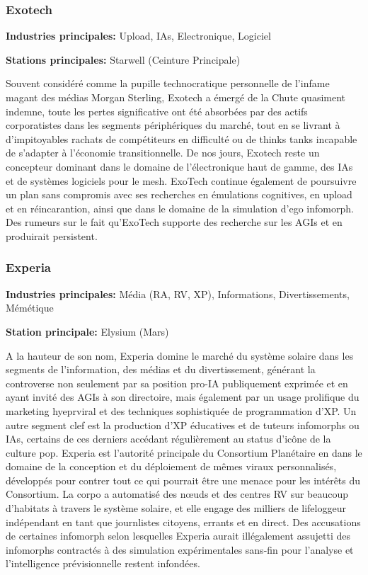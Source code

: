 \subsubsection{Exotech} \label{sec:exotech} 

\textbf{Industries principales:} Upload, IAs, Electronique, Logiciel 

\textbf{Stations principales:} Starwell (Ceinture Principale) 

Souvent considéré comme la pupille technocratique personnelle de l'infame magant des médias Morgan Sterling, Exotech a émergé de la Chute quasiment indemne, toute les pertes significative ont été absorbées par des actifs corporatistes dans les segments périphériques du marché, tout en  se livrant à d'impitoyables rachats de compétiteurs en difficulté ou de thinks tanks incapable de s'adapter à l'économie transitionnelle. De nos jours, Exotech reste un concepteur dominant dans le domaine de l'électronique haut de gamme, des IAs et de systèmes logiciels pour le mesh. ExoTech continue également de poursuivre un plan sans compromis avec ses recherches en émulations cognitives, en upload et en réincarantion, ainsi que dans le domaine de la simulation d'ego infomorph. Des rumeurs sur le fait qu'ExoTech supporte des recherche sur les AGIs et en produirait persistent. 

\subsubsection{Experia} \label{sec:experia} 

\textbf{Industries principales:} Média (RA, RV, XP), Informations, Divertissements, Mémétique 

\textbf{Station principale:} Elysium (Mars) 

A la hauteur de son nom, Experia domine le marché du système solaire dans les segments de l'information, des médias et du divertissement, générant la controverse non seulement par sa position pro-IA publiquement exprimée et en ayant invité des AGIs à son directoire, mais également par un usage prolifique du marketing hyeprviral et des techniques sophistiquée de programmation d'XP. Un autre segment clef est la production d'XP éducatives et de tuteurs infomorphs ou IAs, certains de ces derniers accédant régulièrement au status d'icône de la culture pop. Experia est l'autorité principale du Consortium Planétaire en dans le domaine de la conception et du déploiement de mêmes viraux personnalisés, développés pour contrer tout ce qui pourrait être une menace pour les intérêts du Consortium. La corpo a automatisé des nœuds et des centres RV sur beaucoup d'habitats à travers le système solaire, et elle engage des milliers de lifeloggeur indépendant en tant que journlistes citoyens, errants et en direct. Des accusations de certaines infomorph selon lesquelles Experia aurait illégalement assujetti des infomorphs contractés à des simulation expérimentales sans-fin pour l'analyse et l'intelligence prévisionnelle restent infondées. 

